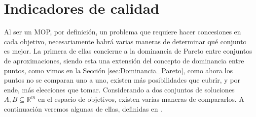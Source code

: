 \section{Indicadores de calidad} \label{sec:QIs}
Al ser un MOP, por definición, un problema que requiere hacer concesiones en cada objetivo, necesariamente habrá varias maneras de determinar qué conjunto es mejor. La primera de ellas concierne a la dominancia de Pareto entre conjuntos de aproximaciones, siendo esta una extensión del concepto de dominancia entre puntos, como vimos en la Sección \ref{sec:Dominancia_Pareto}, como ahora los puntos no se comparan uno a uno, existen más posibilidades que cubrir, y por ende, más elecciones que tomar. Considerando a dos conjuntos de soluciones $A,B \subseteq \mathbb{R}^m$ en el espacio de objetivos, existen varias maneras de compararlos. A continuación veremos algunas de ellas, definidas en \cite{tesis_mst_guillermo}.





